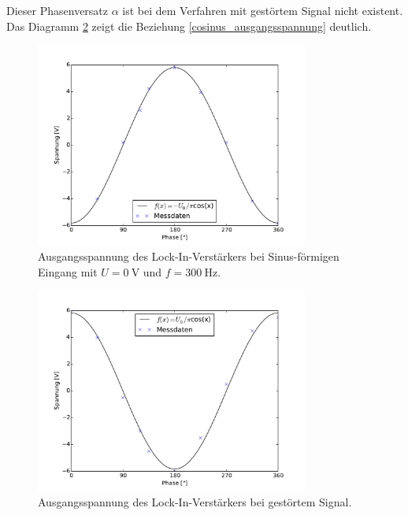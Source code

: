 Dieser Phasenversatz $\alpha$ ist bei dem Verfahren mit gestörtem Signal nicht existent.
Das Diagramm \ref{diag:stoerung} zeigt die Beziehung \eqref{cosinus_ausgangsspannung} deutlich.
\begin{figure}[hp]
	\centering
	\includegraphics[width=0.8\textwidth]{Bilder/AusgangSpannung.pdf}
	\caption{Ausgangsspannung des Lock-In-Verstärkers bei Sinus-förmigen Eingang mit $U = \SI{0}{\volt}$ und $f = \SI{300}{\hertz}$.}
	\label{diag:spannung}
\end{figure}

\begin{figure}[hp]
	\centering
	\includegraphics[width=0.8\textwidth]{Bilder/AusgangStoerung.pdf}
	\caption{Ausgangsspannung des Lock-In-Verstärkers bei gestörtem Signal.}
	\label{diag:stoerung}
\end{figure}

